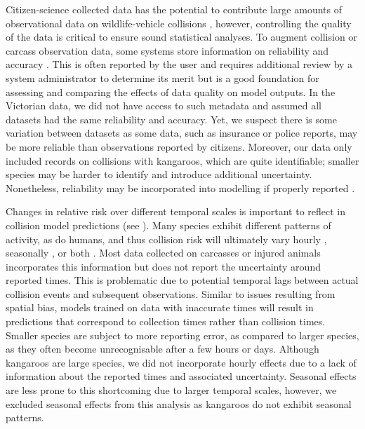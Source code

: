 Citizen-science collected data has the potential to contribute large amounts of observational data on wildlife-vehicle collisions \citep[e.g.][]{cose14,dwye16,paul14}, however, controlling the quality of the data is critical to ensure sound statistical analyses. To augment collision or carcass observation data, some systems store information on reliability and accuracy \citep[e.g.][]{shil15a}. This is often reported by the user and requires additional review by a system administrator to determine its merit but is a good foundation for assessing and comparing the effects of data quality on model outputs. In the Victorian data, we did not have access to such metadata and assumed all datasets had the same reliability and accuracy. Yet, we suspect there is some variation between datasets as some data, such as insurance or police reports, may be more reliable than observations reported by citizens. Moreover, our data only included records on collisions with kangaroos, which are quite identifiable; smaller species may be harder to identify and introduce additional uncertainty. Nonetheless, reliability may be incorporated into modelling if properly reported \citep[see][]{guns09}.

Changes in relative risk over different temporal scales is important to reflect in collision model predictions (see ). Many species exhibit different patterns of activity, as do humans, and thus collision risk will ultimately vary hourly \citep[e.g][]{joyc01}, seasonally \citep[e.g][]{alve12,beau10,gril09}, or both \citep[e.g][]{mizu14,more13}. Most data collected on carcasses or injured animals incorporates this information but does not report the uncertainty around reported times. This is problematic due to potential temporal lags between actual collision events and subsequent observations. Similar to issues resulting from spatial bias, models trained on data with inaccurate times will result in predictions that correspond to collection times rather than collision times. Smaller species are subject to more reporting error, as compared to larger species, as they often become unrecognisable after a few hours or days. Although kangaroos are large species, we did not incorporate hourly effects due to a lack of information about the reported times and associated uncertainty. Seasonal effects are less prone to this shortcoming due to larger temporal scales, however, we excluded seasonal effects from this analysis as kangaroos do not exhibit seasonal patterns. 

